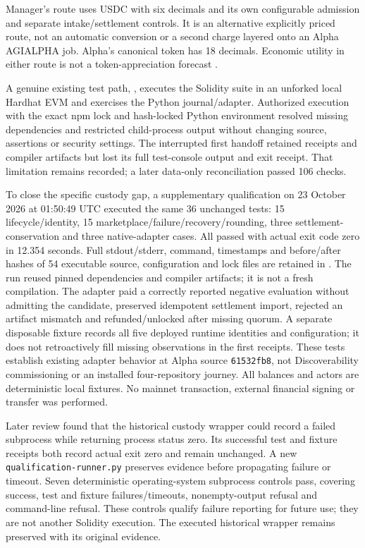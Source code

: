 \documentclass[11pt,letterpaper]{article}
\theoremstyle{definition}\newtheorem{definition}[theorem]{Definition}
\theoremstyle{remark}\newtheorem{remark}[theorem]{Remark}
\begin{document}
Manager's route uses USDC with six decimals and its own configurable admission and separate intake/settlement controls. It is an alternative explicitly priced route, not an automatic conversion or a second charge layered onto an Alpha AGIALPHA job. Alpha's canonical token has 18 decimals. Economic utility in either route is not a token-appreciation forecast \citep{manager}.

A genuine existing test path, , executes the Solidity suite in an unforked local Hardhat EVM and exercises the Python journal/adapter. Authorized execution with the exact npm lock and hash-locked Python environment resolved missing dependencies and restricted child-process output without changing source, assertions or security settings. The interrupted first handoff retained receipts and compiler artifacts but lost its full test-console output and exit receipt. That limitation remains recorded; a later data-only reconciliation passed 106 checks.

To close the specific custody gap, a supplementary qualification on 23 October 2026 at 01:50:49 UTC executed the same 36 unchanged tests: 15 lifecycle/identity, 15 marketplace/failure/recovery/rounding, three settlement-conservation and three native-adapter cases. All passed with actual exit code zero in 12.354 seconds. Full stdout/stderr, command, timestamps and before/after hashes of 54 executable source, configuration and lock files are retained in . The run reused pinned dependencies and compiler artifacts; it is not a fresh compilation. The adapter paid a correctly reported negative evaluation without admitting the candidate, preserved idempotent settlement import, rejected an artifact mismatch and refunded/unlocked after missing quorum. A separate disposable fixture records all five deployed runtime identities and configuration; it does not retroactively fill missing observations in the first receipts. These tests establish existing adapter behavior at Alpha source \texttt{61532fb8}, not Discoverability commissioning or an installed four-repository journey. All balances and actors are deterministic local fixtures. No mainnet transaction, external financial signing or transfer was performed.

Later review found that the historical custody wrapper could record a failed subprocess while returning process status zero. Its successful test and fixture receipts both record actual exit zero and remain unchanged. A new \texttt{qualification-runner.py} preserves evidence before propagating failure or timeout. Seven deterministic operating-system subprocess controls pass, covering success, test and fixture failures/timeouts, nonempty-output refusal and command-line refusal. These controls qualify failure reporting for future use; they are not another Solidity execution. The executed historical wrapper remains preserved with its original evidence.
\end{document}
